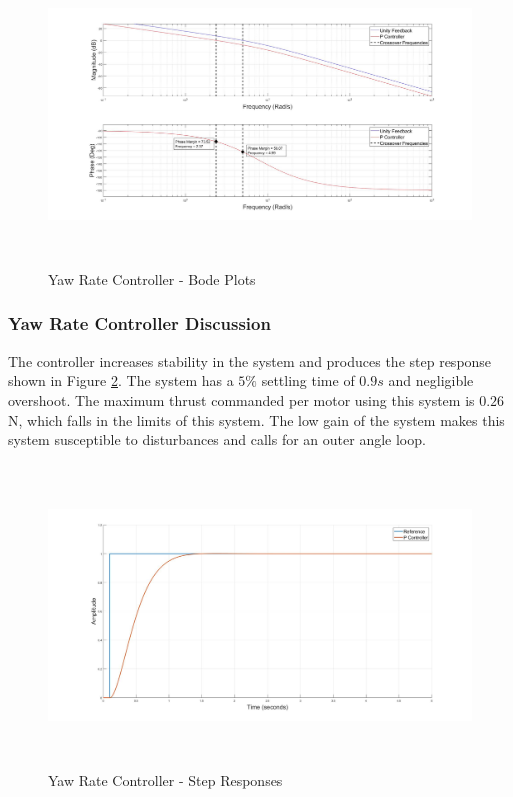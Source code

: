 \documentclass[12pt]{report}
\begin{document}
\begin{figure}[H]
	\centering
	\includegraphics[height = 8cm]{../Design/Matlab/Controllers/yaw_rate_bode.jpg}
	\caption{Yaw Rate Controller -  Bode Plots}
	\label{IM_YawRateControlBode}
\end{figure}

\subsubsection{Yaw Rate Controller Discussion}
The controller increases stability in the system and produces the step response shown in Figure \ref{IM_YawRateStep}. The system has a $5\% $ settling time of $0.9s$ and negligible overshoot. The maximum thrust commanded per motor using this system is $0.26$\,N, which falls in the limits of this system. The low gain of the system makes this system susceptible to disturbances and calls for an outer angle loop. 

\begin{figure}[H]
	\centering
	\includegraphics[height = 8cm]{../Design/Matlab/Controllers/yaw_rate_step.jpg}
	\caption{Yaw Rate Controller -  Step Responses}
	\label{IM_YawRateStep}
\end{figure}
\end{document}
